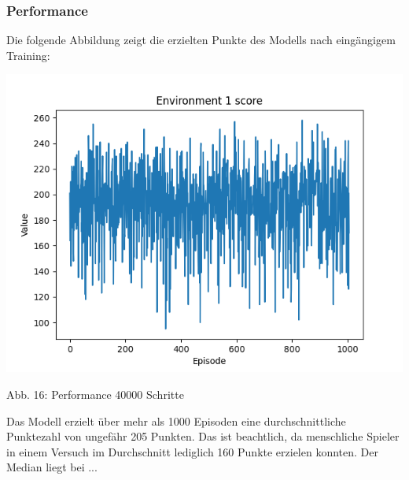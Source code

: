 \subsubsection{Performance}
\begin{minipage}{\linewidth}
	Die folgende Abbildung zeigt die erzielten Punkte des Modells nach eingängigem Training:
	
	\vspace{0.5cm}
	\includegraphics[width=1\textwidth]{Bilder/maskableppo_ganzschoenclever_193avg_v3.1}
	
	Abb. 16: Performance 40000 Schritte\\
\end{minipage}

Das Modell erzielt über mehr als 1000 Episoden eine durchschnittliche Punktezahl von ungefähr 205 Punkten. Das ist beachtlich, da menschliche Spieler in einem Versuch im Durchschnitt lediglich 160 Punkte erzielen konnten. Der Median liegt bei ...

